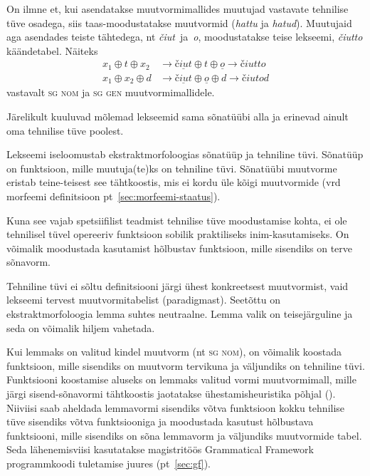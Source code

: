 \documentclass[12pt,a4paper]{article}
\newcommand{\vadja}[1]{\textit{#1}}
\newcommand{\msd}[1]{\textsc{#1}}
\begin{document}
On ilmne et, kui asendatakse muutvormimallides muutujad vastavate tehnilise tüve osadega, siis taas-moodustatakse muutvormid (\vadja{hattu} ja \vadja{hatud}). Muutujaid aga asendades teiste tähtedega, %
nt \textit{čiut}~ja~\textit{o}, moodustatakse teise lekseemi, \vadja{čiutto} käändetabel. Näiteks
\begin{align*}
  x_1 \oplus t \oplus x_2 &\rightarrow \underline{\textit{čiut}} \oplus \textit{t} \oplus \underline{\textit{o}} \rightarrow \textit{čiutto} \nonumber \\
  x_1 \oplus x_2 \oplus d &\rightarrow \underline{\textit{čiut}} \oplus \underline{\textit{o}} \oplus \textit{d} \rightarrow \textit{čiutod} \nonumber
\end{align*}
vastavalt \msd{sg nom} ja \msd{sg gen} muutvormi\-mallidele.

Järelikult kuuluvad mõlemad lekseemid sama sõnatüübi alla ja erinevad ainult oma tehnilise tüve poolest.

Lekseemi iseloomustab ekstraktmorfoloogias sõnatüüp ja tehniline tüvi. Sõnatüüp on funktsioon, mille muutuja(te)ks on tehniline tüvi. Sõnatüübi muutvorme eristab teine-teisest see tähtkoostis, mis ei kordu üle kõigi muutvormide (vrd morfeemi definitsioon pt~\ref{sec:morfeemi-staatus}).

Kuna see vajab spetsiifilist teadmist tehnilise tüve moodustamise kohta, ei ole tehnilisel tüvel opereeriv funktsioon sobilik praktiliseks inim-kasutamiseks. On võimalik moodustada kasutamist hõlbustav funktsioon, mille sisendiks on terve sõnavorm.

Tehniline tüvi ei sõltu definitsiooni järgi ühest konkreetsest muutvormist, vaid lekseemi tervest muutvormi\-tabelist (paradigmast). Seetõttu on ekstrakt\-morfoloogia lemma suhtes neutraalne. Lemma valik on teise\-järguline ja seda on võimalik hiljem vahetada. %

Kui lemmaks on valitud kindel muutvorm (nt \msd{sg nom}), on võimalik koostada funktsioon, mille sisendiks on muutvorm tervikuna ja väljundiks on tehniline tüvi. Funktsiooni koostamise aluseks on lemmaks valitud vormi muutvormi\-mall, mille järgi sisend-sõnavormi tähtkoostis jaotatakse ühestamisheuristika põhjal (\cite[572]{ahlberg_semi-supervised_2014}). Niiviisi saab aheldada lemmavormi sisendiks võtva funktsioon kokku tehnilise tüve sisendiks võtva funktsiooniga ja moodustada kasutust hõlbustava funktsiooni, mille sisendiks on sõna lemmavorm ja väljundiks muutvormide tabel. Seda lähenemisviisi kasutatakse magistritöös Grammatical Framework programmkoodi tuletamise juures (pt~\ref{sec:gf}). %
\end{document}
